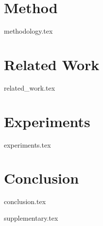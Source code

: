 
\section{Method}\label{sec:method}
{methodology.tex}

\section{Related Work}\label{sec:related_work}
{related_work.tex}

\section{Experiments}\label{sec:exps}
{experiments.tex}

\section{Conclusion}\label{sec:conclusion}
{conclusion.tex}


% 

\newpage
\appendix
{supplementary.tex}




% 

